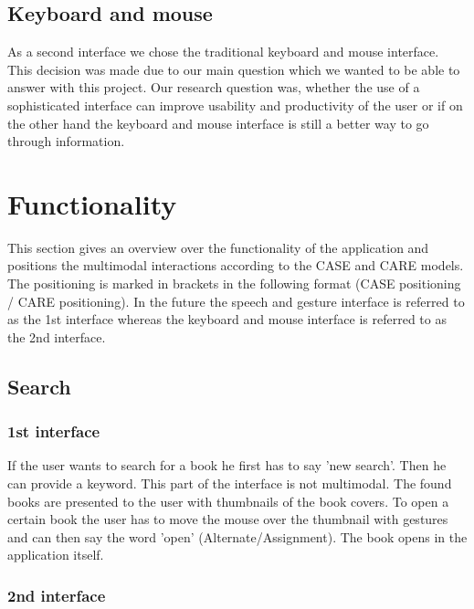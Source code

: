 \documentclass[a4paper, 10pt]{article}
\begin{document}
	\subsection{Keyboard and mouse}
	
	\par{As a second interface we chose the traditional keyboard and mouse interface. This decision was made due to our main question which we wanted to be able to answer with this project. Our research question was, whether the use of a sophisticated interface can improve usability and productivity of the user or if on the other hand the keyboard and mouse interface is still a better way to go through information.}
	
	
	\section{Functionality}
	
	\par{This section gives an overview over the functionality of the application and positions the multimodal interactions according to the CASE and CARE models. The positioning is marked in brackets in the following format (CASE positioning / CARE positioning). In the future the speech and gesture interface is referred to as the 1st interface whereas the keyboard and mouse interface is referred to as the 2nd interface.}
	
	\subsection{Search}
	
	\subsubsection{1st interface}
	
	\par{If the user wants to search for a book he first has to say 'new search'. Then he can provide a keyword. This part of the interface is not multimodal. The found books are presented to the user with thumbnails of the book covers. To open a certain book the user has to move the mouse over the thumbnail with gestures and can then say the word 'open'  (Alternate/Assignment). The book opens in the application itself.}
	
	\subsubsection{2nd interface}
	
\end{document}
